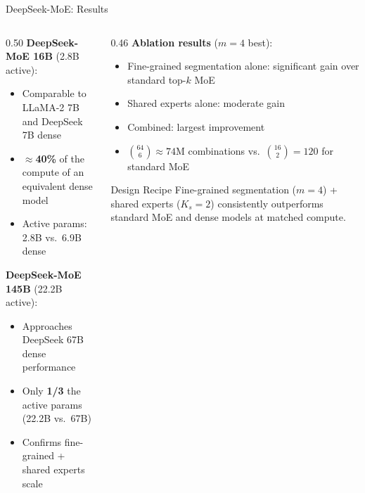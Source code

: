 \begin{frame}{DeepSeek-MoE: Results}

  \begin{columns}
    \begin{column}{0.50\textwidth}
      \textbf{DeepSeek-MoE 16B} (2.8B active):
      \begin{itemize}
        \item Comparable to LLaMA-2 7B and DeepSeek 7B dense
        \item $\approx$\textbf{40\%} of the compute of an equivalent dense model
        \item Active params: 2.8B vs.\ 6.9B dense
      \end{itemize}

      \vspace{0.3em}
      \textbf{DeepSeek-MoE 145B} (22.2B active):
      \begin{itemize}
        \item Approaches DeepSeek 67B dense performance
        \item Only \textbf{1/3} the active params (22.2B vs.\ 67B)
        \item Confirms fine-grained + shared experts scale
      \end{itemize}
    \end{column}
    \begin{column}{0.46\textwidth}
      \textbf{Ablation results} ($m = 4$ best):
      \begin{itemize}
        \item Fine-grained segmentation alone: significant gain over standard top-$k$ MoE
        \item Shared experts alone: moderate gain
        \item Combined: largest improvement
        \item $\binom{64}{6} \approx 74$M combinations vs.\ $\binom{16}{2} = 120$ for standard MoE
      \end{itemize}

      \vspace{0.3em}
      \begin{block}{Design Recipe}
        Fine-grained segmentation ($m{=}4$) + shared experts ($K_s{=}2$) consistently outperforms standard MoE and dense models at matched compute.
      \end{block}
    \end{column}
  \end{columns}
\end{frame}

